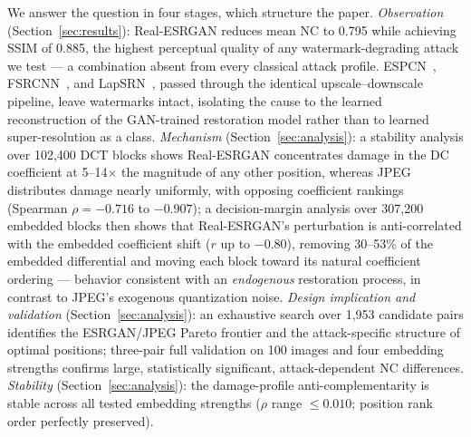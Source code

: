 \documentclass[conference]{IEEEtran}
\begin{document}
We answer the question in four stages, which structure the paper.
\emph{Observation} (Section~\ref{sec:results}): Real-ESRGAN reduces
mean NC to 0.795 while achieving SSIM of 0.885, the highest perceptual
quality of any watermark-degrading attack we test --- a combination
absent from every classical attack profile. ESPCN~\cite{espcn2016},
FSRCNN~\cite{fsrcnn2016}, and LapSRN~\cite{lapsrn2017}, passed through
the identical upscale--downscale pipeline, leave watermarks intact,
isolating the cause to the learned reconstruction of the GAN-trained
restoration model rather than to learned super-resolution as a class.
\emph{Mechanism} (Section~\ref{sec:analysis}): a stability analysis over
102,400 DCT blocks shows Real-ESRGAN concentrates damage in the DC
coefficient at 5--14$\times$ the magnitude of any other position, whereas
JPEG distributes damage nearly uniformly, with opposing coefficient
rankings (Spearman $\rho = -0.716$ to $-0.907$); a decision-margin
analysis over 307,200 embedded blocks then shows that Real-ESRGAN's
perturbation is anti-correlated with the embedded coefficient shift
($r$ up to $-0.80$), removing 30--53\% of the embedded differential and
moving each block toward its natural coefficient ordering --- behavior
consistent with an \emph{endogenous} restoration process, in contrast
to JPEG's exogenous quantization noise.
\emph{Design implication and validation}
(Section~\ref{sec:analysis}): an exhaustive search over 1,953 candidate
pairs identifies the ESRGAN/JPEG Pareto frontier and the attack-specific
structure of optimal positions; three-pair full validation on 100 images
and four embedding strengths confirms large, statistically significant,
attack-dependent NC differences.
\emph{Stability} (Section~\ref{sec:analysis}): the damage-profile
anti-complementarity is stable across all tested embedding strengths
($\rho$ range $\leq 0.010$; position rank order perfectly preserved).
\end{document}
